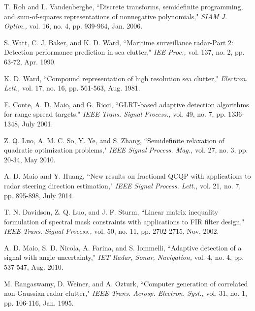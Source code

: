 \begin{thebibliography}{12}
T. Roh and L. Vandenberghe, ``Discrete transforms, semidefinite programming, and sum-of-squares representations of nonnegative polynomials," \emph{SIAM J. Optim.,} vol. 16, no. 4, pp. 939-964, Jan. 2006.

S. Watt, C. J. Baker, and K. D. Ward, ``Maritime surveillance radar-Part 2: Detection performance prediction in sea clutter," \emph{IEE Proc.,} vol. 137, no. 2, pp. 63-72, Apr. 1990.

K. D. Ward, ``Compound representation of high resolution sea clutter," \emph{Electron. Lett.,} vol. 17, no. 16, pp. 561-563, Aug. 1981.

 E. Conte, A. D. Maio, and G. Ricci, ``GLRT-based adaptive detection algorithms for range spread targets," \emph{IEEE Trans. Signal Process.,} vol. 49,
no. 7, pp. 1336-1348, July 2001.


Z. Q. Luo, A. M. C. So, Y. Ye, and S. Zhang, ``Semidefinite relaxation of quadratic optimization problems,"
\emph{IEEE Signal Process. Mag.,} vol. 27, no. 3, pp. 20-34, May 2010.

A. D. Maio and Y. Huang, ``New results on fractional QCQP with applications to radar steering direction estimation," \emph{IEEE Signal Process. Lett.,} vol. 21, no. 7, pp. 895-898, July 2014.

 T. N. Davidson, Z. Q. Luo, and J. F. Sturm, ``Linear matrix inequality formulation of spectral mask constraints with applications
 to FIR filter design,"
 \emph{IEEE Trans. Signal Process.,} vol. 50,
no. 11, pp. 2702-2715, Nov. 2002.

 A. D. Maio, S. D. Nicola, A. Farina, and S. Iommelli, ``Adaptive detection of a signal with angle uncertainty," \emph{IET Radar, Sonar, Navigation,} vol. 4,
no. 4, pp. 537-547, Aug. 2010.

M. Rangaswamy, D. Weiner, and A. Ozturk, ``Computer generation of correlated non-Gaussian radar clutter,"
 \emph{IEEE Trans. Aerosp. Electron. Syst.,} vol. 31,
no. 1, pp. 106-116, Jan. 1995.





\end{thebibliography} 